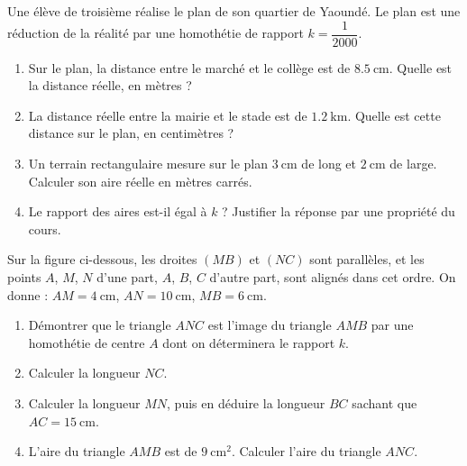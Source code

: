 \documentclass[11pt]{article}
\begin{document}
\begin{exercice}
Une élève de troisième réalise le plan de son quartier de Yaoundé. Le plan est une réduction de la réalité par une homothétie de rapport $k = \dfrac{1}{2000}$.
\begin{enumerate}
\item Sur le plan, la distance entre le marché et le collège est de $\SI{8,5}{\centi\metre}$. Quelle est la distance réelle, en mètres ?
\item La distance réelle entre la mairie et le stade est de $\SI{1,2}{\kilo\metre}$. Quelle est cette distance sur le plan, en centimètres ?
\item Un terrain rectangulaire mesure sur le plan $\SI{3}{\centi\metre}$ de long et $\SI{2}{\centi\metre}$ de large. Calculer son aire réelle en mètres carrés.
\item Le rapport des aires est-il égal à $k$ ? Justifier la réponse par une propriété du cours.
\end{enumerate}
\end{exercice}

\begin{exercice}
Sur la figure ci-dessous, les droites $(MB)$ et $(NC)$ sont parallèles, et les points $A$, $M$, $N$ d'une part, $A$, $B$, $C$ d'autre part, sont alignés dans cet ordre. On donne : $AM = \SI{4}{\centi\metre}$, $AN = \SI{10}{\centi\metre}$, $MB = \SI{6}{\centi\metre}$.
\begin{enumerate}
\item Démontrer que le triangle $ANC$ est l'image du triangle $AMB$ par une homothétie de centre $A$ dont on déterminera le rapport $k$.
\item Calculer la longueur $NC$.
\item Calculer la longueur $MN$, puis en déduire la longueur $BC$ sachant que $AC = \SI{15}{\centi\metre}$.
\item L'aire du triangle $AMB$ est de $\SI{9}{\centi\metre\squared}$. Calculer l'aire du triangle $ANC$.
\end{enumerate}
\end{exercice}
\end{document}
